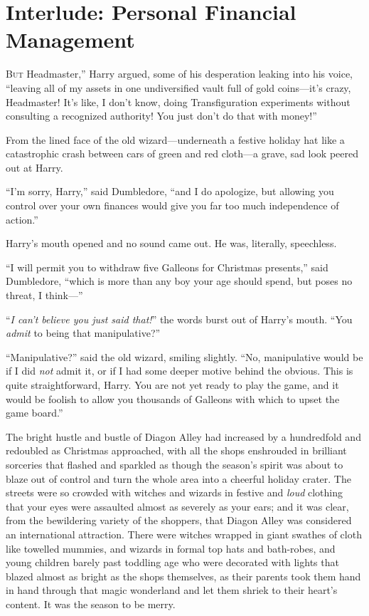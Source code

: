 \chapter{Interlude: Personal Financial Management}

\lettrine[ante=“]{B}{ut} Headmaster,” Harry argued, some of his desperation leaking into his voice, “leaving all of my assets in one undiversified vault full of gold coins—it’s crazy, Headmaster! It’s like, I don’t know, doing Transfiguration experiments without consulting a recognized authority! You just don’t do that with money!”

From the lined face of the old wizard—underneath a festive holiday hat like a catastrophic crash between cars of green and red cloth—a grave, sad look peered out at Harry.

“I’m sorry, Harry,” said Dumbledore, “and I do apologize, but allowing you control over your own finances would give you far too much independence of action.”

Harry’s mouth opened and no sound came out. He was, literally, speechless.

“I will permit you to withdraw five Galleons for Christmas presents,” said Dumbledore, “which is more than any boy your age should spend, but poses no threat, I think—”

“\emph{I can’t believe you just said that!}” the words burst out of Harry’s mouth.
“You \emph{admit} to being that manipulative?”

“Manipulative?” said the old wizard, smiling slightly.
“No, manipulative would be if I did \emph{not} admit it, or if I had some deeper motive behind the obvious. This is quite straightforward, Harry. You are not yet ready to play the game, and it would be foolish to allow you thousands of Galleons with which to upset the game board.”

\later

The bright hustle and bustle of Diagon Alley had increased by a hundredfold and redoubled as Christmas approached, with all the shops enshrouded in brilliant sorceries that flashed and sparkled as though the season’s spirit was about to blaze out of control and turn the whole area into a cheerful holiday crater. The streets were so crowded with witches and wizards in festive and \emph{loud} clothing that your eyes were assaulted almost as severely as your ears; and it was clear, from the bewildering variety of the shoppers, that Diagon Alley was considered an international attraction. There were witches wrapped in giant swathes of cloth like towelled mummies, and wizards in formal top hats and bath-robes, and young children barely past toddling age who were decorated with lights that blazed almost as bright as the shops themselves, as their parents took them hand in hand through that magic wonderland and let them shriek to their heart’s content. It was the season to be merry.

